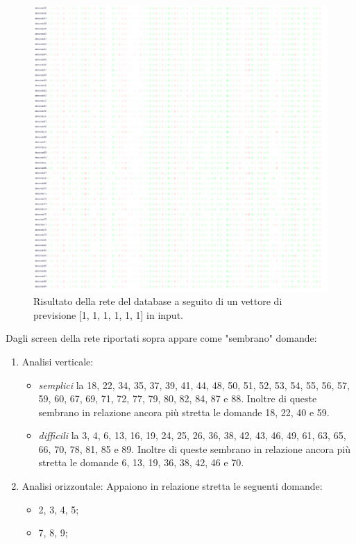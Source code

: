 \begin{itemize}
\begin{figure}[H]
\centering
	\includegraphics[width=0.90\linewidth]{./image/rete_db-vp1_2.png}
	\caption{Risultato della rete del database a seguito di un vettore di previsione [1, 1, 1, 1, 1, 1] in input.}
	\label{Risultato della rete del database a seguito di un vettore di previsione [1, 1, 1, 1, 1, 1] in input.}
\end{figure}
\noindent
Dagli screen della rete riportati sopra appare come "sembrano" domande:
\begin{enumerate}
\item Analisi verticale:
\begin{itemize}
\item \textit{semplici} la 18, 22, 34, 35, 37, 39, 41, 44, 48, 50, 51, 52, 53, 54, 55, 56, 57, 59, 60, 67, 69,  71, 72, 77, 79, 80, 82, 84, 87 e 88. Inoltre di queste sembrano in relazione ancora pi\`u stretta le domande 18, 22, 40 e 59.
\item \textit{difficili} la 3, 4, 6, 13, 16, 19, 24, 25, 26, 36, 38, 42, 43, 46, 49, 61, 63, 65, 66, 70, 78, 81, 85 e 89. Inoltre di queste sembrano in relazione ancora pi\`u stretta le domande 6, 13, 19, 36, 38, 42, 46 e 70.
\end{itemize}
\item Analisi orizzontale:
Appaiono in relazione stretta le seguenti domande:
\begin{itemize}
\item 2, 3, 4, 5;
\item 7, 8, 9;

\end{itemize}
\end{enumerate}
\end{itemize}
